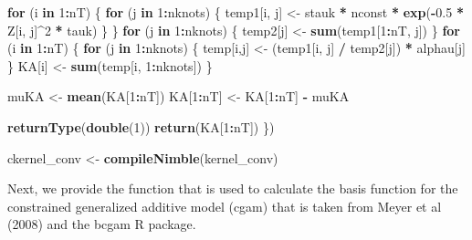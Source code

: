 \documentclass[11pt,]{article}
\newenvironment{Shaded}{\begin{snugshade}}{\end{snugshade}}
\newcommand{\KeywordTok}[1]{\textcolor[rgb]{0.13,0.29,0.53}{\textbf{#1}}}
\newcommand{\DecValTok}[1]{\textcolor[rgb]{0.00,0.00,0.81}{#1}}
\newcommand{\FloatTok}[1]{\textcolor[rgb]{0.00,0.00,0.81}{#1}}
\newcommand{\StringTok}[1]{\textcolor[rgb]{0.31,0.60,0.02}{#1}}
\newcommand{\ControlFlowTok}[1]{\textcolor[rgb]{0.13,0.29,0.53}{\textbf{#1}}}
\newcommand{\OperatorTok}[1]{\textcolor[rgb]{0.81,0.36,0.00}{\textbf{#1}}}
\newcommand{\NormalTok}[1]{#1}
\begin{document}
\begin{Shaded}
\begin{Highlighting}[]
    \ControlFlowTok{for}\NormalTok{ (i }\ControlFlowTok{in} \DecValTok{1}\OperatorTok{:}\NormalTok{nT) \{}
      \ControlFlowTok{for}\NormalTok{ (j }\ControlFlowTok{in} \DecValTok{1}\OperatorTok{:}\NormalTok{nknots) \{}
\NormalTok{        temp1[i, j] <-}\StringTok{ }\NormalTok{stauk }\OperatorTok{*}\StringTok{ }\NormalTok{nconst }\OperatorTok{*}\StringTok{ }\KeywordTok{exp}\NormalTok{(}\OperatorTok{-}\FloatTok{0.5} \OperatorTok{*}\StringTok{ }\NormalTok{Z[i, j]}\OperatorTok{^}\DecValTok{2} \OperatorTok{*}\StringTok{ }\NormalTok{tauk)}
\NormalTok{      \}}
\NormalTok{    \}}
    \ControlFlowTok{for}\NormalTok{ (j }\ControlFlowTok{in} \DecValTok{1}\OperatorTok{:}\NormalTok{nknots) \{}
\NormalTok{      temp2[j] <-}\StringTok{ }\KeywordTok{sum}\NormalTok{(temp1[}\DecValTok{1}\OperatorTok{:}\NormalTok{nT, j])}
\NormalTok{    \}}
    \ControlFlowTok{for}\NormalTok{ (i }\ControlFlowTok{in} \DecValTok{1}\OperatorTok{:}\NormalTok{nT) \{}
      \ControlFlowTok{for}\NormalTok{ (j }\ControlFlowTok{in} \DecValTok{1}\OperatorTok{:}\NormalTok{nknots) \{}
\NormalTok{        temp[i,j] <-}\StringTok{ }\NormalTok{(temp1[i, j] }\OperatorTok{/}\StringTok{ }\NormalTok{temp2[j]) }\OperatorTok{*}\StringTok{ }\NormalTok{alphau[j]}
\NormalTok{      \}}
\NormalTok{      KA[i] <-}\StringTok{ }\KeywordTok{sum}\NormalTok{(temp[i, }\DecValTok{1}\OperatorTok{:}\NormalTok{nknots])}
\NormalTok{    \}}

\NormalTok{    muKA <-}\StringTok{ }\KeywordTok{mean}\NormalTok{(KA[}\DecValTok{1}\OperatorTok{:}\NormalTok{nT])}
\NormalTok{    KA[}\DecValTok{1}\OperatorTok{:}\NormalTok{nT] <-}\StringTok{ }\NormalTok{KA[}\DecValTok{1}\OperatorTok{:}\NormalTok{nT] }\OperatorTok{-}\StringTok{ }\NormalTok{muKA}

    \KeywordTok{returnType}\NormalTok{(}\KeywordTok{double}\NormalTok{(}\DecValTok{1}\NormalTok{))}
    \KeywordTok{return}\NormalTok{(KA[}\DecValTok{1}\OperatorTok{:}\NormalTok{nT])}
\NormalTok{  \})}

\NormalTok{ckernel_conv <-}\StringTok{ }\KeywordTok{compileNimble}\NormalTok{(kernel_conv)}
\end{Highlighting}
\end{Shaded}

Next, we provide the function that is used to calculate the basis
function for the constrained generalized additive model (cgam) that is
taken from Meyer et al (2008) and the bcgam R package.
\end{document}
